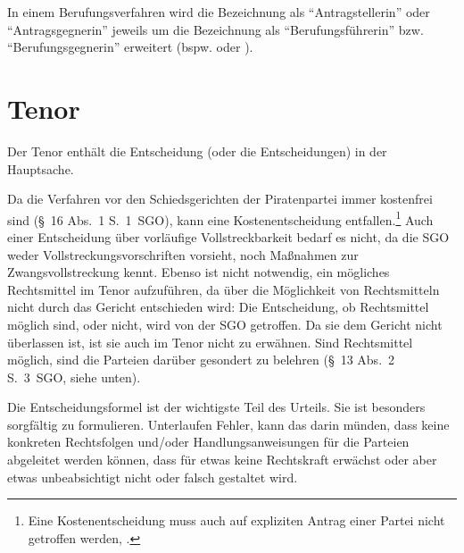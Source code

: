 In einem Berufungsverfahren wird die Bezeichnung als \enquote{Antragstellerin} oder \enquote{Antragsgegnerin} jeweils um die Bezeichnung als \enquote{Berufungsführerin} bzw. \enquote{Berufungsgegnerin} erweitert (bspw.  oder ).

\section{Tenor}
\label{Urteilsaufbau:Tenor}
Der Tenor enthält die Entscheidung (oder die Entscheidungen) in der Hauptsache.

Da die Verfahren vor den Schiedsgerichten der Piratenpartei immer kostenfrei sind (\S~16 Abs.~1 S.~1~SGO), kann eine Kostenentscheidung entfallen.\footnote{Eine Kostenentscheidung muss auch auf expliziten Antrag einer Partei nicht getroffen werden, \cite{LSGNRW2016001HStreitwert}.}
Auch einer Entscheidung über vorläufige Vollstreckbarkeit bedarf es nicht, da die SGO weder Vollstreckungsvorschriften vorsieht, noch Maßnahmen zur Zwangsvollstreckung kennt.
Ebenso ist nicht notwendig, ein mögliches Rechtsmittel im Tenor aufzuführen, da über die Möglichkeit von Rechtsmitteln nicht durch das Gericht entschieden wird:
Die Entscheidung, ob Rechtsmittel möglich sind, oder nicht, wird von der SGO getroffen.
Da sie dem Gericht nicht überlassen ist, ist sie auch im Tenor nicht zu erwähnen.
Sind Rechtsmittel möglich, sind die Parteien darüber gesondert zu belehren (\S~13 Abs.~2 S.~3~SGO, siehe unten).

Die Entscheidungsformel ist der wichtigste Teil des Urteils.
Sie ist besonders sorgfältig zu formulieren.
Unterlaufen Fehler, kann das darin münden, dass keine konkreten Rechtsfolgen und/oder Handlungsanweisungen für die Parteien abgeleitet werden können, dass für etwas keine Rechtskraft erwächst oder aber etwas unbeabsichtigt nicht oder falsch gestaltet wird.

